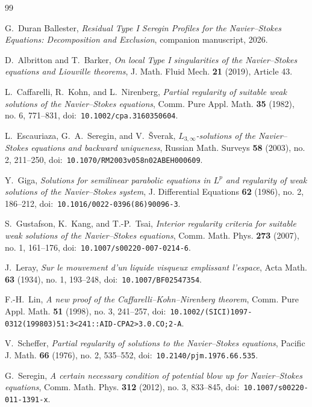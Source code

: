 \documentclass[11pt]{amsart}
\theoremstyle{plain}
\theoremstyle{definition}
\theoremstyle{remark}
\numberwithin{equation}{section}
\begin{document}
\begin{thebibliography}{99}

G.~Duran Ballester,
\emph{Residual Type I Seregin Profiles for the Navier--Stokes Equations:
Decomposition and Exclusion},
companion manuscript, 2026.

D.~Albritton and T.~Barker,
\emph{On local Type I singularities of the Navier--Stokes equations and
Liouville theorems},
J. Math. Fluid Mech. \textbf{21} (2019), Article 43.

L.~Caffarelli, R.~Kohn, and L.~Nirenberg,
\emph{Partial regularity of suitable weak solutions of the Navier--Stokes
 equations},
Comm. Pure Appl. Math. \textbf{35} (1982), no. 6, 771--831,
doi:\ \nolinkurl{10.1002/cpa.3160350604}.

L.~Escauriaza, G.~A.~Seregin, and V.~{\v S}verak,
\emph{\(L_{3,\infty}\)-solutions of the Navier--Stokes equations and
 backward uniqueness},
Russian Math. Surveys \textbf{58} (2003), no. 2, 211--250,
doi:\ \nolinkurl{10.1070/RM2003v058n02ABEH000609}.

Y.~Giga,
\emph{Solutions for semilinear parabolic equations in \(L^p\) and regularity
 of weak solutions of the Navier--Stokes system},
J. Differential Equations \textbf{62} (1986), no. 2, 186--212,
doi:\ \nolinkurl{10.1016/0022-0396(86)90096-3}.

S.~Gustafson, K.~Kang, and T.-P.~Tsai,
\emph{Interior regularity criteria for suitable weak solutions of the
 Navier--Stokes equations},
Comm. Math. Phys. \textbf{273} (2007), no. 1, 161--176,
doi:\ \nolinkurl{10.1007/s00220-007-0214-6}.

J.~Leray,
\emph{Sur le mouvement d'un liquide visqueux emplissant l'espace},
Acta Math. \textbf{63} (1934), no. 1, 193--248,
doi:\ \nolinkurl{10.1007/BF02547354}.

F.-H.~Lin,
\emph{A new proof of the Caffarelli--Kohn--Nirenberg theorem},
Comm. Pure Appl. Math. \textbf{51} (1998), no. 3, 241--257,
doi:\ \nolinkurl{10.1002/(SICI)1097-0312(199803)51:3<241::AID-CPA2>3.0.CO;2-A}.

V.~Scheffer,
\emph{Partial regularity of solutions to the Navier--Stokes equations},
Pacific J. Math. \textbf{66} (1976), no. 2, 535--552,
doi:\ \nolinkurl{10.2140/pjm.1976.66.535}.

G.~Seregin,
\emph{A certain necessary condition of potential blow up for Navier--Stokes
 equations},
Comm. Math. Phys. \textbf{312} (2012), no. 3, 833--845,
doi:\ \nolinkurl{10.1007/s00220-011-1391-x}.


\end{thebibliography}
\end{document}
